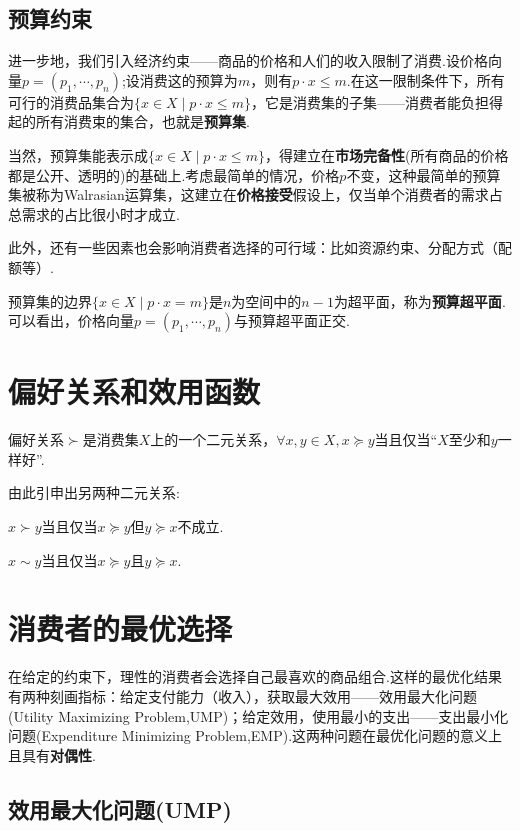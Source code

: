 \documentclass[lang=cn,10pt]{elegantbook}
\begin{document}
\subsection{预算约束}
    进一步地，我们引入经济约束——商品的价格和人们的收入限制了消费.设价格向量$p=(p_1,\cdots,p_n)$;设消费这的预算为$m$，则有$p\cdot x\leq m$.在这一限制条件下，所有可行的消费品集合为$\{x\in X\mid p\cdot x\leq m\}$，它是消费集的子集——消费者能负担得起的所有消费束的集合，也就是\textbf{预算集}.

    当然，预算集能表示成$\{x\in X\mid p\cdot x\leq m\}$，得建立在\textbf{市场完备性}(所有商品的价格都是公开、透明的)的基础上.考虑最简单的情况，价格$p$不变，这种最简单的预算集被称为Walrasian运算集，这建立在\textbf{价格接受}假设上，仅当单个消费者的需求占总需求的占比很小时才成立.

    此外，还有一些因素也会影响消费者选择的可行域：比如资源约束、分配方式（配额等）.

    预算集的边界$\{x\in X\mid p\cdot x=m\}$是$n$为空间中的$n-1$为超平面，称为\textbf{预算超平面}.可以看出，价格向量$p=(p_1,\cdots,p_n)$与预算超平面正交.
\newpage
\section{偏好关系和效用函数}
\begin{definition}
偏好关系$\succ$是消费集$X$上的一个二元关系，$\forall x,y\in X,x\succeq y$当且仅当“$X$至少和$y$一样好”.
\end{definition}
由此引申出另两种二元关系:
\begin{definition}[严格偏好关系]
    $x\succ y$当且仅当$x\succeq y$但$y\succeq x$不成立.
\end{definition}
\begin{definition}[无差异关系]
    $x\sim y$当且仅当$x\succeq y$且$y\succeq x$.
\end{definition}
\newpage
\section{消费者的最优选择}
在给定的约束下，理性的消费者会选择自己最喜欢的商品组合.这样的最优化结果有两种刻画指标：给定支付能力（收入），获取最大效用——效用最大化问题(Utility Maximizing Problem,UMP)；给定效用，使用最小的支出——支出最小化问题(Expenditure Minimizing Problem,EMP).这两种问题在最优化问题的意义上且具有\textbf{对偶性}.

\subsection{效用最大化问题(UMP)}
\newpage
\end{document}
